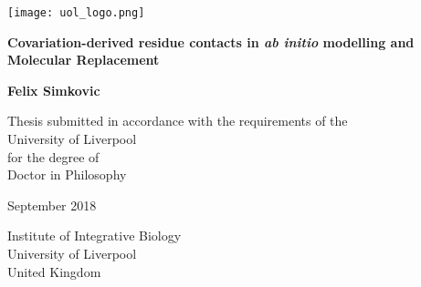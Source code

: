 \begin{titlepage}
    \begin{center}
        \vspace{1cm}
        
        \texttt{[image: uol\_logo.png]}
        
        \vspace{1cm}

        \Huge
        \textbf{Covariation-derived residue contacts in \textit{ab initio} modelling and Molecular Replacement}
        
        \vspace{1.5cm}
        
        \huge
        \textbf{Felix Simkovic}

        
        \vfill

        \Large
        Thesis submitted in accordance with the requirements of the \\
        University of Liverpool\\
        for the degree of\\
        Doctor in Philosophy
        
        \vspace{1.0cm}

        September 2018

        \vspace{1.0cm}
        
        \Large
        Institute of Integrative Biology\\
        University of Liverpool\\
        United Kingdom
        
    \end{center}
\end{titlepage}
